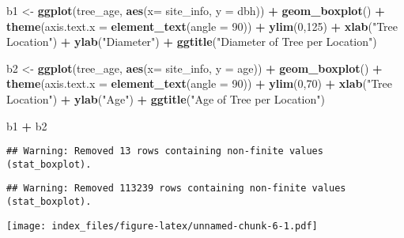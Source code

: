 \documentclass[
]{article}
\newenvironment{Shaded}{\begin{snugshade}}{\end{snugshade}}
\newcommand{\DataTypeTok}[1]{\textcolor[rgb]{0.13,0.29,0.53}{#1}}
\newcommand{\DecValTok}[1]{\textcolor[rgb]{0.00,0.00,0.81}{#1}}
\newcommand{\KeywordTok}[1]{\textcolor[rgb]{0.13,0.29,0.53}{\textbf{#1}}}
\newcommand{\NormalTok}[1]{#1}
\newcommand{\OperatorTok}[1]{\textcolor[rgb]{0.81,0.36,0.00}{\textbf{#1}}}
\newcommand{\StringTok}[1]{\textcolor[rgb]{0.31,0.60,0.02}{#1}}
\begin{document}
\begin{Shaded}
\begin{Highlighting}[]
\NormalTok{b1 <-}\StringTok{ }\KeywordTok{ggplot}\NormalTok{(tree_age, }\KeywordTok{aes}\NormalTok{(}\DataTypeTok{x=}\NormalTok{ site_info, }\DataTypeTok{y =}\NormalTok{ dbh)) }\OperatorTok{+}
\StringTok{  }\KeywordTok{geom_boxplot}\NormalTok{() }\OperatorTok{+}
\StringTok{  }\KeywordTok{theme}\NormalTok{(}\DataTypeTok{axis.text.x =} \KeywordTok{element_text}\NormalTok{(}\DataTypeTok{angle =} \DecValTok{90}\NormalTok{)) }\OperatorTok{+}
\StringTok{  }\KeywordTok{ylim}\NormalTok{(}\DecValTok{0}\NormalTok{,}\DecValTok{125}\NormalTok{) }\OperatorTok{+}
\StringTok{  }\KeywordTok{xlab}\NormalTok{(}\StringTok{"Tree Location"}\NormalTok{) }\OperatorTok{+}
\StringTok{  }\KeywordTok{ylab}\NormalTok{(}\StringTok{"Diameter"}\NormalTok{) }\OperatorTok{+}
\StringTok{  }\KeywordTok{ggtitle}\NormalTok{(}\StringTok{"Diameter of Tree per Location"}\NormalTok{)}

\NormalTok{b2 <-}\StringTok{ }\KeywordTok{ggplot}\NormalTok{(tree_age, }\KeywordTok{aes}\NormalTok{(}\DataTypeTok{x=}\NormalTok{ site_info, }\DataTypeTok{y =}\NormalTok{ age)) }\OperatorTok{+}
\StringTok{  }\KeywordTok{geom_boxplot}\NormalTok{() }\OperatorTok{+}
\StringTok{  }\KeywordTok{theme}\NormalTok{(}\DataTypeTok{axis.text.x =} \KeywordTok{element_text}\NormalTok{(}\DataTypeTok{angle =} \DecValTok{90}\NormalTok{)) }\OperatorTok{+}
\StringTok{  }\KeywordTok{ylim}\NormalTok{(}\DecValTok{0}\NormalTok{,}\DecValTok{70}\NormalTok{) }\OperatorTok{+}
\StringTok{  }\KeywordTok{xlab}\NormalTok{(}\StringTok{"Tree Location"}\NormalTok{) }\OperatorTok{+}
\StringTok{  }\KeywordTok{ylab}\NormalTok{(}\StringTok{"Age"}\NormalTok{) }\OperatorTok{+}
\StringTok{  }\KeywordTok{ggtitle}\NormalTok{(}\StringTok{"Age of Tree per Location"}\NormalTok{)}

\NormalTok{b1 }\OperatorTok{+}\StringTok{ }\NormalTok{b2}
\end{Highlighting}
\end{Shaded}

\begin{verbatim}
## Warning: Removed 13 rows containing non-finite values (stat_boxplot).
\end{verbatim}

\begin{verbatim}
## Warning: Removed 113239 rows containing non-finite values (stat_boxplot).
\end{verbatim}

\texttt{[image: index\_files/figure-latex/unnamed-chunk-6-1.pdf]}
\end{document}
